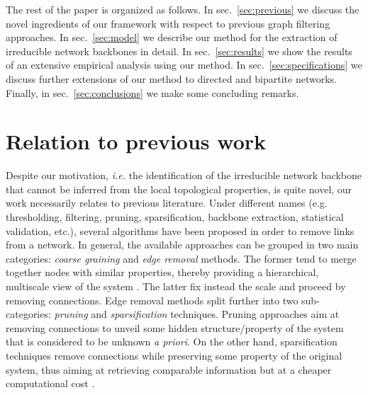 \documentclass[aps,twocolumn,superscriptaddress]{revtex4-1}
\newcommand{\ie}{\emph{i.e.} }
\begin{document}
The rest of the paper is organized as follows.
In sec.~\ref{sec:previous} we discuss the novel ingredients of our framework with respect to previous graph filtering approaches.
In sec.~\ref{sec:model} we describe our method for the extraction of irreducible network backbones in detail.
In sec.~\ref{sec:results} we show the results of an extensive empirical analysis using our method.
In sec.~\ref{sec:specifications} we discuss further extensions of our method to directed and bipartite networks.
Finally, in sec.~\ref{sec:conclusions} we make some concluding remarks.

 











\section{Relation to previous work\label{sec:previous}}

Despite our motivation, \ie the identification of the irreducible network backbone that cannot be inferred from the local topological properties, is quite novel, our work necessarily relates to previous literature.
Under different names (e.g. thresholding, filtering, pruning, sparsification, backbone extraction, statistical validation, etc.), several algorithms have been proposed in order to remove links from a network. 
In general, the available approaches can be grouped in two main categories: \emph{coarse graining} and \emph{edge removal} methods. 
The former tend to merge together nodes with similar properties, thereby providing a hierarchical, multiscale view of the system \cite{kim-prl-2004, gfeller-prl-2007}. 
The latter fix instead the scale and proceed by removing connections. 
Edge removal methods split further into two sub-categories: \emph{pruning} and \emph{sparsification} techniques. Pruning approaches aim at removing connections to unveil some hidden structure/property of the system that is considered to be unknown \emph{a priori}. On the other hand, sparsification techniques remove connections while preserving some property of the original system, thus aiming at retrieving comparable information but at a cheaper computational cost \cite{hamann-arxiv-2016,coscia-arxiv-2017,sparsification}.
\end{document}
